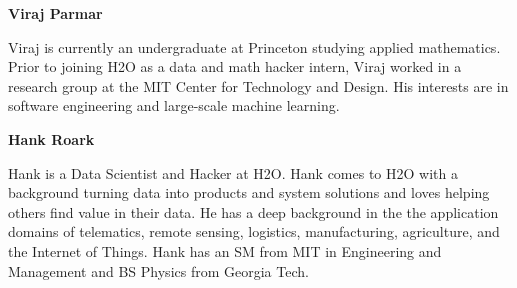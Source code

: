 \textbf{Viraj Parmar}

Viraj is currently an undergraduate at Princeton studying applied mathematics. Prior to joining H2O as a data and math hacker intern, Viraj worked in a research group at the MIT Center for Technology and Design. His interests are in software engineering and large-scale machine learning. 

\textbf{Hank Roark}

Hank is a Data Scientist and Hacker at H2O. Hank comes to H2O with a background turning data into products and system solutions and loves helping others find value in their data. He has a deep background in the the application domains of telematics, remote sensing, logistics, manufacturing, agriculture, and the Internet of Things. Hank has an SM from MIT in Engineering and Management and BS Physics from Georgia Tech.


